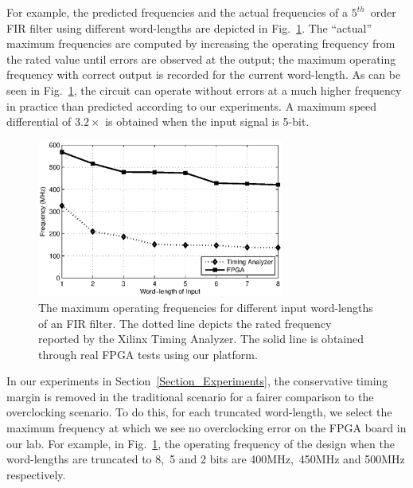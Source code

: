 \documentclass[journal]{IEEEtran}
\begin{document}
For example, the predicted frequencies and the actual frequencies of a $5^{th}$~order FIR filter using different word-lengths are depicted in Fig.~\ref{TimingMargin}. The ``actual'' maximum frequencies are computed by increasing the operating frequency from the rated value until errors are observed at the output; the maximum operating frequency with correct output is recorded for the current word-length. As can be seen in Fig.~\ref{TimingMargin}, the circuit can operate without errors at a much higher frequency in practice than predicted according to our experiments. A maximum speed differential of $3.2\times$ is obtained when the input signal is 5-bit.

\begin{figure}[t]
  \centering
  \includegraphics[width=3.2in]{./Figures/Exp/FIR/RatedFrequency3.eps}
  \caption{The maximum operating frequencies for different input word-lengths of an FIR filter. The dotted line depicts the rated frequency reported by the Xilinx Timing Analyzer. The solid line is obtained through real FPGA tests using our platform.}
  \label{TimingMargin}
\end{figure}

In our experiments in Section~\ref{Section_Experiments}, the conservative timing margin is removed in the traditional scenario for a fairer comparison to the overclocking scenario. To do this, for each truncated word-length, we select the maximum frequency at which we see no overclocking error on the FPGA board in our lab. For example, in Fig.~\ref{TimingMargin}, the operating frequency of the design when the word-lengths are truncated to 8,~5 and 2 bits are 400MHz,~450MHz and 500MHz respectively.
\end{document}

